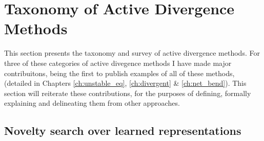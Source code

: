 

\section{Taxonomy of Active Divergence Methods}

This section presents the taxonomy and survey of active divergence methods. 
For three of these categories of active divegence methods I have made major contribuitons, being the first to publish examples of all of these methods, (detailed in Chapters \ref{ch:unstable_eq}, \ref{ch:divergent} \& \ref{ch:net_bend}).
This section will reiterate these contributions, for the purposes of defining, formally explaining and delineating them from other approaches.

\subsection{Novelty search over learned representations}
\label{survey:noveltysearch}

